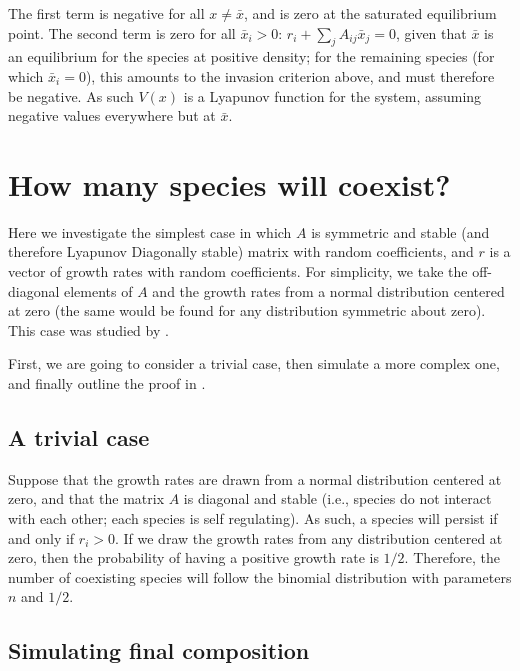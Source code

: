 \documentclass[]{book}
\begin{document}
The first term is negative for all \(x \neq \bar{x}\), and is zero at the saturated equilibrium point. The second term is zero for all \(\bar{x}_i > 0\): \(r_i + \sum_j A_{ij} \bar{x}_j = 0\), given that \(\bar{x}\) is an equilibrium for the species at positive density; for the remaining species (for which \(\bar{x}_i = 0\)), this amounts to the invasion criterion above, and must therefore be negative. As such \(V(x)\) is a Lyapunov function for the system, assuming negative values everywhere but at \(\bar{x}\).

\hypertarget{how-many-species-will-coexist}{%
\section{How many species will coexist?}\label{how-many-species-will-coexist}}

Here we investigate the simplest case in which \(A\) is symmetric and stable (and therefore Lyapunov Diagonally stable) matrix with random coefficients, and \(r\) is a vector of growth rates with random coefficients. For simplicity, we take the off-diagonal elements of \(A\) and the growth rates from a normal distribution centered at zero (the same would be found for any distribution symmetric about zero). This case was studied by \citet{servan2018coexistence}.

First, we are going to consider a trivial case, then simulate a more complex one, and finally outline the proof in \citet{servan2018coexistence}.

\hypertarget{a-trivial-case}{%
\subsection{A trivial case}\label{a-trivial-case}}

Suppose that the growth rates are drawn from a normal distribution centered at zero, and that the matrix \(A\) is diagonal and stable (i.e., species do not interact with each other; each species is self regulating). As such, a species will persist if and only if \(r_i > 0\). If we draw the growth rates from any distribution centered at zero, then the probability of having a positive growth rate is \(1/2\). Therefore, the number of coexisting species will follow the binomial distribution with parameters \(n\) and \(1/2\).

\hypertarget{simulating-final-composition}{%
\subsection{Simulating final composition}\label{simulating-final-composition}}
\end{document}
